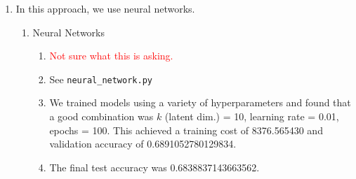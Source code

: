\documentclass{article}
\begin{document}
\begin{enumerate}[label=\arabic*.]
    \item In this approach, we use neural networks. %
        \begin{enumerate}[label=(\roman*)]
            \addtocounter{enumii}{1}
            \item Neural Networks
                \begin{enumerate}[label=(\alph*)]
                    \item \textcolor{red}{Not sure what this is asking.}
                    \item See \texttt{neural\_network.py}
                    \item We trained models using a variety of hyperparameters and found that a good combination was $k$ (latent dim.) = 10, learning rate = 0.01, epochs = 100. This achieved a training cost of 8376.565430	 and validation accuracy of 0.6891052780129834.
                    \item The final test accuracy was 0.6838837143663562.


\end{enumerate}
\end{enumerate}
\end{enumerate}
\end{document}
